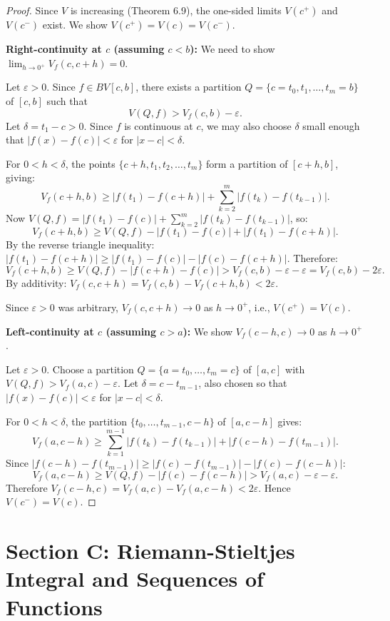 \documentclass[12pt,a4paper]{article}
\theoremstyle{definition}
\newcommand{\eps}{\varepsilon}
\begin{document}
\begin{proof}
Since $V$ is increasing (Theorem 6.9), the one-sided limits $V(c^+)$ and $V(c^-)$ exist. We show $V(c^+) = V(c) = V(c^-)$.

\textbf{Right-continuity at $c$ (assuming $c < b$):} We need to show $\lim_{h \to 0^+} V_f(c, c+h) = 0$.

Let $\eps > 0$. Since $f \in BV[c, b]$, there exists a partition $Q = \{c = t_0, t_1, \ldots, t_m = b\}$ of $[c,b]$ such that
\[
    V(Q, f) > V_f(c, b) - \eps.
\]
Let $\delta = t_1 - c > 0$. Since $f$ is continuous at $c$, we may also choose $\delta$ small enough that $|f(x) - f(c)| < \eps$ for $|x - c| < \delta$.

For $0 < h < \delta$, the points $\{c+h, t_1, t_2, \ldots, t_m\}$ form a partition of $[c+h, b]$, giving:
\[
    V_f(c+h, b) \geq |f(t_1) - f(c+h)| + \sum_{k=2}^m |f(t_k) - f(t_{k-1})|.
\]
Now $V(Q, f) = |f(t_1) - f(c)| + \sum_{k=2}^m |f(t_k) - f(t_{k-1})|$, so:
\[
    V_f(c+h, b) \geq V(Q, f) - |f(t_1) - f(c)| + |f(t_1) - f(c+h)|.
\]
By the reverse triangle inequality: $|f(t_1) - f(c+h)| \geq |f(t_1) - f(c)| - |f(c) - f(c+h)|$. Therefore:
\[
    V_f(c+h, b) \geq V(Q, f) - |f(c+h) - f(c)| > V_f(c,b) - \eps - \eps = V_f(c,b) - 2\eps.
\]
By additivity: $V_f(c, c+h) = V_f(c,b) - V_f(c+h, b) < 2\eps$.

Since $\eps > 0$ was arbitrary, $V_f(c, c+h) \to 0$ as $h \to 0^+$, i.e., $V(c^+) = V(c)$.

\medskip
\textbf{Left-continuity at $c$ (assuming $c > a$):} We show $V_f(c-h, c) \to 0$ as $h \to 0^+$.

Let $\eps > 0$. Choose a partition $Q = \{a = t_0, \ldots, t_m = c\}$ of $[a,c]$ with $V(Q, f) > V_f(a,c) - \eps$. Let $\delta = c - t_{m-1}$, also chosen so that $|f(x) - f(c)| < \eps$ for $|x-c| < \delta$.

For $0 < h < \delta$, the partition $\{t_0, \ldots, t_{m-1}, c-h\}$ of $[a, c-h]$ gives:
\[
    V_f(a, c-h) \geq \sum_{k=1}^{m-1}|f(t_k)-f(t_{k-1})| + |f(c-h) - f(t_{m-1})|.
\]
Since $|f(c-h) - f(t_{m-1})| \geq |f(c) - f(t_{m-1})| - |f(c) - f(c-h)|$:
\[
    V_f(a, c-h) \geq V(Q, f) - |f(c) - f(c-h)| > V_f(a,c) - \eps - \eps.
\]
Therefore $V_f(c-h, c) = V_f(a,c) - V_f(a, c-h) < 2\eps$. Hence $V(c^-) = V(c)$.
\end{proof}

\newpage
\section{Section C: Riemann-Stieltjes Integral and Sequences of Functions}
\end{document}
